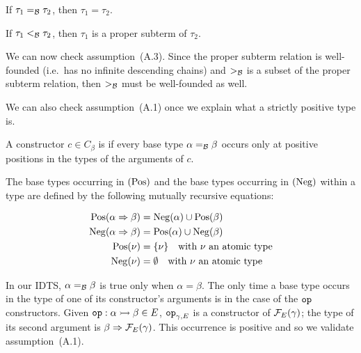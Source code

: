 \begin{corollary}\label{cor:base-type-eq}
  If $\tau_1 =_{\mathcal{B}} \tau_2$, then $\tau_1 = \tau_2$.
\end{corollary}

\begin{corollary}\label{cor:base-type-lt}
  If $\tau_1 <_{\mathcal{B}} \tau_2$, then $\tau_1$ is a proper subterm of $\tau_2$.
\end{corollary}

We can now check assumption~(A.3). Since the proper subterm relation is
well-founded (i.e.\ has no infinite descending chains) and $>_{\mathcal{B}}$ is a
subset of the proper subterm relation, then $>_{\mathcal{B}}$ must be well-founded as
well.

We can also check assumption~(A.1) once we explain what a strictly positive
type is.

\begin{definition}\label{def:positive-constructor}
  A constructor $c \in C_\beta$ is  if every base type
  $\alpha =_{\mathcal{B}} \beta$ occurs only at positive positions in the types of
  the arguments of $c$.
\end{definition}

\begin{definition}
  The base types occurring in  $(\operatorname{Pos})$ and the
  base types occurring in  $(\operatorname{Neg})$ within a type
  are defined by the following mutually recursive equations:

  \begin{align*}
    \operatorname{Pos}(\alpha \Rightarrow \beta) &= \operatorname{Neg}(\alpha) \cup \operatorname{Pos}(\beta) \\
    \operatorname{Neg}(\alpha \Rightarrow \beta) &= \operatorname{Pos}(\alpha) \cup \operatorname{Neg}(\beta) \\
    \operatorname{Pos}(\nu) &= \{ \nu \} \text{\quad with $\nu$ an atomic type} \\
    \operatorname{Neg}(\nu) &= \emptyset \text{\quad with $\nu$ an atomic type}
  \end{align*}
\end{definition}

In our IDTS, $\alpha =_{\mathcal{B}} \beta$ is true only when $\alpha = \beta$. The
only time a base type occurs in the type of one of its constructor's
arguments is in the case of the $\mathtt{op}$ constructors. Given
$\mathtt{op} : \alpha \rightarrowtail \beta \in E$, $\mathtt{op}_{\gamma,E}$ is a constructor
of $\mathcal{F}_E(\gamma)$; the type of its second argument is
$\beta \Rightarrow \mathcal{F}_E(\gamma)$. This occurrence is positive and so we validate
assumption~(A.1).

